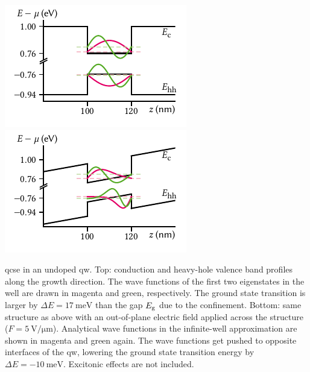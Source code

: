 \begin{marginfigure}
    \centering
    \includegraphics{img/pdf/experiment/qw_undoped_0V}
    \includegraphics{img/pdf/experiment/qw_undoped_1V}
    \caption[]{
        \Gls{qcse} in an undoped \acrshort{qw}.
        Top: conduction and heavy-hole valence band profiles along the growth direction.
        The wave functions of the first two eigenstates in the well are drawn in magenta and green, respectively.
        The ground state transition is larger by $\Delta E = \qty{17}{\milli\electronvolt}$ than the gap $E_{\mathrm{g}}$ due to the confinement.
        Bottom: same structure as above with an out-of-plane electric field applied across the structure ($F=\qty{5}{\volt\per\micro\meter}$).
        Analytical wave functions in the infinite-well approximation are shown in magenta and green again.
        The wave functions get pushed to opposite interfaces of the \acrshort{qw}, lowering the ground state transition energy by $\Delta E = -\qty{10}{\milli\electronvolt}$.
        Excitonic effects are not included.
    }
    \label{fig:exp:theory:qcse:bandstructure}
\end{marginfigure}

